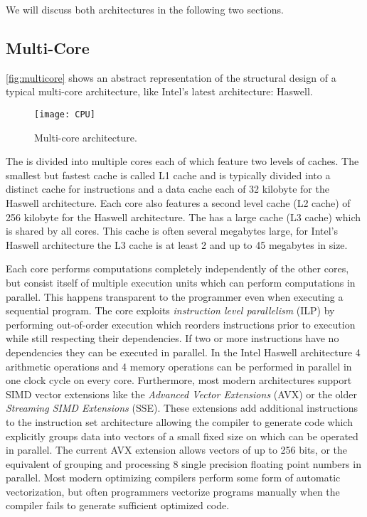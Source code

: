 We will discuss both architectures in the following two sections.

\subsection{Multi-Core \CPUs}
\autoref{fig:multicore} shows an abstract representation of the structural design of a typical multi-core \CPU architecture, like Intel's latest \CPU architecture: Haswell.
\begin{figure}
  \centering
  \texttt{[image: CPU]}
  \caption{Multi-core architecture.}
  \label{fig:multicore}
\end{figure}
The \CPU is divided into multiple cores each of which feature two levels of caches.
The smallest but fastest cache is called L1 cache and is typically divided into a distinct cache for instructions and a data cache each of 32 kilobyte for the Haswell architecture.
Each core also features a second level cache (L2 cache) of 256 kilobyte for the Haswell architecture.
The \CPU has a large cache (L3 cache) which is shared by all cores.
This cache is often several megabytes large, for Intel's Haswell architecture the L3 cache is at least 2 and up to 45 megabytes in size.

Each \CPU core performs computations completely independently of the other cores, but consist itself of multiple execution units which can perform computations in parallel.
This happens transparent to the programmer even when executing a sequential program.
The \CPU core exploits \emph{instruction level parallelism} (ILP) by performing out-of-order execution which reorders instructions prior to execution while still respecting their dependencies.
If two or more instructions have no dependencies they can be executed in parallel.
In the Intel Haswell architecture 4 arithmetic operations and 4 memory operations can be performed in parallel in one clock cycle on every core.
Furthermore, most modern \CPU architectures support SIMD vector extensions like the \emph{Advanced Vector Extensions} (AVX) or the older \emph{Streaming SIMD Extensions} (SSE).
These extensions add additional instructions to the instruction set architecture allowing the compiler to generate code which explicitly groups data into vectors of a small fixed size on which can be operated in parallel.
The current AVX extension allows vectors of up to 256 bits, or the equivalent of grouping and processing 8 single precision floating point numbers in parallel.
Most modern optimizing compilers perform some form of automatic vectorization, but often programmers vectorize programs manually when the compiler fails to generate sufficient optimized code.

